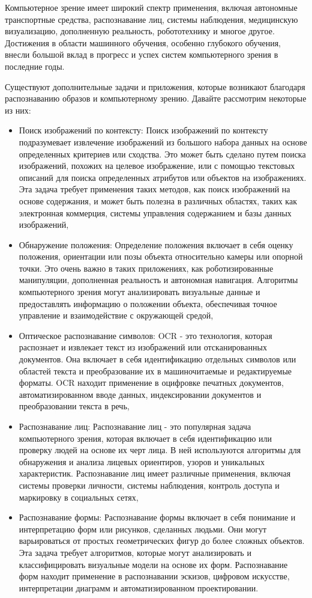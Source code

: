Компьютерное зрение имеет широкий спектр применения, включая автономные транспортные средства, распознавание лиц, системы наблюдения, медицинскую визуализацию, дополненную реальность, робототехнику и многое другое. Достижения в области машинного обучения, особенно глубокого обучения, внесли большой вклад в прогресс и успех систем компьютерного зрения в последние годы.

Существуют дополнительные задачи и приложения, которые возникают благодаря распознаванию образов и компьютерному зрению. Давайте рассмотрим некоторые из них:

\begin{itemize}
    \item Поиск изображений по контексту: Поиск изображений по контексту подразумевает извлечение изображений из большого набора данных на основе определенных критериев или сходства. Это может быть сделано путем поиска изображений, похожих на целевое изображение, или с помощью текстовых описаний для поиска определенных атрибутов или объектов на изображениях. Эта задача требует применения таких методов, как поиск изображений на основе содержания, и может быть полезна в различных областях, таких как электронная коммерция, системы управления содержанием и базы данных изображений,
    \item Обнаружение положения: Определение положения включает в себя оценку положения, ориентации или позы объекта относительно камеры или опорной точки. Это очень важно в таких приложениях, как роботизированные манипуляции, дополненная реальность и автономная навигация. Алгоритмы компьютерного зрения могут анализировать визуальные данные и предоставлять информацию о положении объекта, обеспечивая точное управление и взаимодействие с окружающей средой,
    \item Оптическое распознавание символов: OCR - это технология, которая распознает и извлекает текст из изображений или отсканированных документов. Она включает в себя идентификацию отдельных символов или областей текста и преобразование их в машиночитаемые и редактируемые форматы. OCR находит применение в оцифровке печатных документов, автоматизированном вводе данных, индексировании документов и преобразовании текста в речь,
    \item Распознавание лиц: Распознавание лиц - это популярная задача компьютерного зрения, которая включает в себя идентификацию или проверку людей на основе их черт лица. В ней используются алгоритмы для обнаружения и анализа лицевых ориентиров, узоров и уникальных характеристик. Распознавание лиц имеет различные применения, включая системы проверки личности, системы наблюдения, контроль доступа и маркировку в социальных сетях,
    \item Распознавание формы: Распознавание формы включает в себя понимание и интерпретацию форм или рисунков, сделанных людьми. Они могут варьироваться от простых геометрических фигур до более сложных объектов. Эта задача требует алгоритмов, которые могут анализировать и классифицировать визуальные модели на основе их форм. Распознавание форм находит применение в распознавании эскизов, цифровом искусстве, интерпретации диаграмм и автоматизированном проектировании.
\end{itemize}


